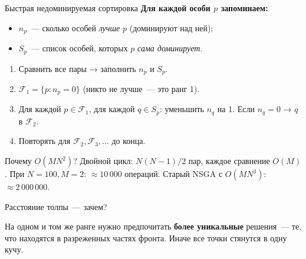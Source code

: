 \documentclass[aspectratio=169,11pt]{beamer}
\begin{document}
\begin{frame}{Быстрая недоминируемая сортировка}
  \textbf{Для каждой особи $p$ запоминаем:}
  \begin{itemize}
    \item $n_p$~--- сколько особей \emph{лучше} $p$ (доминируют над ней);
    \item $S_p$~--- список особей, которых $p$ \emph{сама доминирует}.
  \end{itemize}
  \vspace{0.15cm}
  \footnotesize
  \begin{enumerate}
    \item Сравнить все пары → заполнить $n_p$ и $S_p$.
    \item $\mathcal{F}_1 = \{p : n_p = 0\}$ (никто не лучше~--- это ранг 1).
    \item Для каждой $p \in \mathcal{F}_1$, для каждой $q \in S_p$:
          уменьшить $n_q$ на 1. Если $n_q = 0$ → $q$ в $\mathcal{F}_2$.
    \item Повторять для $\mathcal{F}_2, \mathcal{F}_3,\ldots$ до конца.
  \end{enumerate}
  \normalsize
  \vspace{0.2cm}
  \begin{alertblock}{Почему $O(MN^2)$?}
    Двойной цикл: $N(N-1)/2$ пар, каждое сравнение $O(M)$.
    При $N=100, M=2$: $\approx 10\,000$ операций.
    Старый NSGA с $O(MN^3)$: $\approx 2\,000\,000$.
  \end{alertblock}
\end{frame}

\begin{frame}{Расстояние толпы~--- зачем?}\small
  \begin{exampleblock}{}
    На одном и том же ранге нужно предпочитать \textbf{более уникальные}
    решения~--- те, что находятся в разреженных частях фронта.
    Иначе все точки стянутся в одну кучу.
  \end{exampleblock}
  \vspace{0.2cm}
  \centering
\end{frame}
\end{document}
